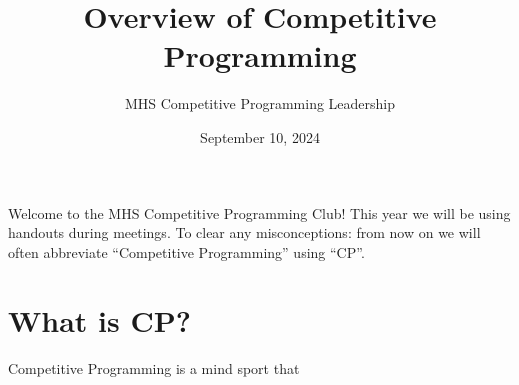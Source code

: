 \documentclass{article}
\title{Overview of Competitive Programming}
\date{September 10, 2024}
\author{MHS Competitive Programming Leadership}
\begin{document}
\maketitle
Welcome to the MHS Competitive Programming Club! This year we will be using handouts during meetings. To clear any misconceptions: from now on we will often abbreviate ``Competitive Programming'' using ``CP''.

\section{What is CP?}
Competitive Programming is a mind sport that 
\end{document}

